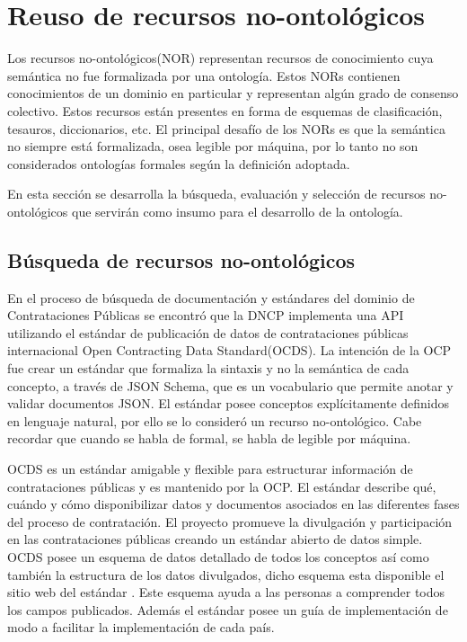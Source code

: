 
\section{Reuso de recursos no-ontológicos}
Los recursos no-ontológicos(NOR)\cite{ReusoRecursoNoOntologico} representan recursos de conocimiento cuya semántica no fue formalizada por una ontología. Estos NORs contienen conocimientos de un dominio en particular y representan algún grado de consenso colectivo. Estos recursos están presentes en forma de esquemas de clasificación, tesauros, diccionarios, etc. El principal desafío de los NORs es que la semántica no siempre está formalizada, osea legible por máquina, por lo tanto no son considerados ontologías formales según la definición adoptada.

En esta sección se desarrolla la búsqueda, evaluación y selección de recursos no-ontológicos que servirán como insumo para el desarrollo de la ontología.

\subsection{Búsqueda de recursos no-ontológicos }

En el proceso de búsqueda de documentación y estándares del dominio de Contrataciones Públicas se encontró que la DNCP implementa una API utilizando el estándar de publicación de datos de contrataciones públicas internacional Open Contracting Data Standard(OCDS). La intención de la OCP fue crear un estándar que formaliza la sintaxis y no la semántica de cada concepto, a través de JSON Schema\cite{JSONSche10:online}, que es un vocabulario que permite anotar y validar documentos JSON. El estándar posee conceptos explícitamente definidos en lenguaje natural, por ello se lo consideró un recurso no-ontológico. Cabe recordar que cuando se habla de formal, se habla de legible por máquina. 

OCDS es un estándar amigable y flexible para estructurar información de contrataciones públicas y es mantenido por la OCP. El estándar describe qué, cuándo y cómo disponibilizar datos y documentos asociados en las diferentes fases del proceso de contratación. El proyecto promueve la divulgación y participación en las contrataciones públicas creando un estándar abierto de datos simple. OCDS posee un esquema de datos detallado de todos los conceptos así como también la estructura de los datos divulgados, dicho esquema esta disponible el sitio web del estándar \cite{OCDSReleaseSchema:online}. Este esquema ayuda a las personas a comprender todos los campos publicados. Además el estándar posee un guía de implementación de modo a facilitar la implementación de cada país.

